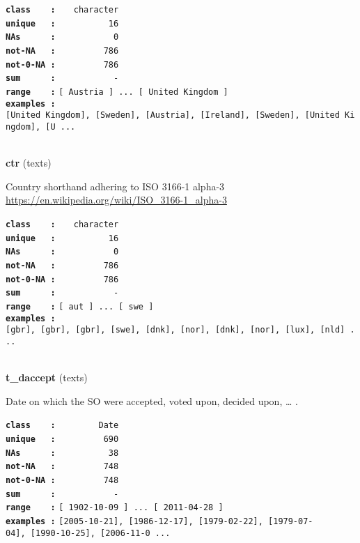 \documentclass[]{article}
\begin{document}
\textbf{\texttt{class\ \ \ \ :}} \texttt{~~~character}\\
\textbf{\texttt{unique\ \ \ :}} \texttt{~~~~~~~~~~16}\\
\textbf{\texttt{NAs\ \ \ \ \ \ :}} \texttt{~~~~~~~~~~~0}\\
\textbf{\texttt{not-NA\ \ \ :}} \texttt{~~~~~~~~~786}\\
\textbf{\texttt{not-0-NA\ :}} \texttt{~~~~~~~~~786}\\
\textbf{\texttt{sum\ \ \ \ \ \ :}} \texttt{~~~~~~~~~~~-}\\
\textbf{\texttt{range\ \ \ \ :}}
\texttt{{[}\ Austria\ {]}\ ...\ {[}\ United\ Kingdom\ {]}}\\
\textbf{\texttt{examples\ :}}
\texttt{{[}United\ Kingdom{]},\ {[}Sweden{]},\ {[}Austria{]},\ {[}Ireland{]},\ {[}Sweden{]},\ {[}United\ Kingdom{]},\ {[}U\ ...}\\

~

\textbf{ctr} (texts)

Country shorthand adhering to ISO 3166-1 alpha-3
\url{https://en.wikipedia.org/wiki/ISO_3166-1_alpha-3}

\textbf{\texttt{class\ \ \ \ :}} \texttt{~~~character}\\
\textbf{\texttt{unique\ \ \ :}} \texttt{~~~~~~~~~~16}\\
\textbf{\texttt{NAs\ \ \ \ \ \ :}} \texttt{~~~~~~~~~~~0}\\
\textbf{\texttt{not-NA\ \ \ :}} \texttt{~~~~~~~~~786}\\
\textbf{\texttt{not-0-NA\ :}} \texttt{~~~~~~~~~786}\\
\textbf{\texttt{sum\ \ \ \ \ \ :}} \texttt{~~~~~~~~~~~-}\\
\textbf{\texttt{range\ \ \ \ :}}
\texttt{{[}\ aut\ {]}\ ...\ {[}\ swe\ {]}}\\
\textbf{\texttt{examples\ :}}
\texttt{{[}gbr{]},\ {[}gbr{]},\ {[}gbr{]},\ {[}swe{]},\ {[}dnk{]},\ {[}nor{]},\ {[}dnk{]},\ {[}nor{]},\ {[}lux{]},\ {[}nld{]}\ ...}\\

~

\textbf{t\_daccept} (texts)

Date on which the SO were accepted, voted upon, decided upon, \ldots{} .

\textbf{\texttt{class\ \ \ \ :}} \texttt{~~~~~~~~Date}\\
\textbf{\texttt{unique\ \ \ :}} \texttt{~~~~~~~~~690}\\
\textbf{\texttt{NAs\ \ \ \ \ \ :}} \texttt{~~~~~~~~~~38}\\
\textbf{\texttt{not-NA\ \ \ :}} \texttt{~~~~~~~~~748}\\
\textbf{\texttt{not-0-NA\ :}} \texttt{~~~~~~~~~748}\\
\textbf{\texttt{sum\ \ \ \ \ \ :}} \texttt{~~~~~~~~~~~-}\\
\textbf{\texttt{range\ \ \ \ :}}
\texttt{{[}\ 1902-10-09\ {]}\ ...\ {[}\ 2011-04-28\ {]}}\\
\textbf{\texttt{examples\ :}}
\texttt{{[}2005-10-21{]},\ {[}1986-12-17{]},\ {[}1979-02-22{]},\ {[}1979-07-04{]},\ {[}1990-10-25{]},\ {[}2006-11-0\ ...}\\
\end{document}
